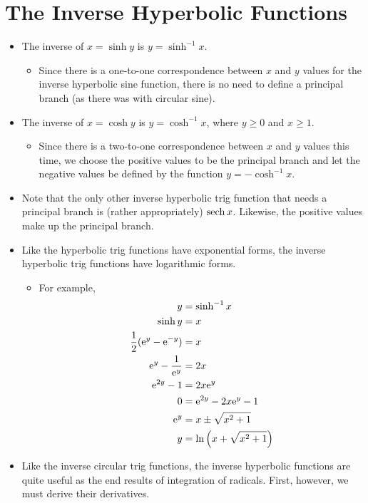 \documentclass[../main.tex]{subfiles}
\begin{document}
\section{The Inverse Hyperbolic Functions}
\begin{itemize}
    \item {}The inverse of $x=\sinh y$ is $y=\sinh^{-1} x$.
    \begin{itemize}
        \item Since there is a one-to-one correspondence between $x$ and $y$ values for the inverse hyperbolic sine function, there is no need to define a principal branch (as there was with circular sine).
    \end{itemize}
    \item The inverse of $x=\cosh y$ is $y=\cosh^{-1} x$, where $y\geq 0$ and $x\geq 1$.
    \begin{itemize}
        \item Since there is a two-to-one correspondence between $x$ and $y$ values this time, we choose the positive values to be the principal branch and let the negative values be defined by the function $y=-\cosh^{-1} x$.
    \end{itemize}
    \item Note that the only other inverse hyperbolic trig function that needs a principal branch is (rather appropriately) $\sech x$. Likewise, the positive values make up the principal branch.
    \item Like the hyperbolic trig functions have exponential forms, the inverse hyperbolic trig functions have logarithmic forms.
    \begin{itemize}
        \item For example,
        \begin{align*}
            y &= \sinh^{-1} x\\
            \sinh y &= x\\
            \frac{1}{2}(\e[y]-\e[-y]) &= x\\
            \e[y]-\frac{1}{\e[y]} &= 2x\\
            \e[2y]-1 &= 2x\e[y]\\
            0 &= \e[2y]-2x\e[y]-1\\
            \e[y] &= x\pm\sqrt{x^2+1}\\
            y &= \ln\left( x+\sqrt{x^2+1} \right)
        \end{align*}
    \end{itemize}
    \item Like the inverse circular trig functions, the inverse hyperbolic functions are quite useful as the end results of integration of radicals. First, however, we must derive their derivatives.

\end{itemize}
\end{document}
